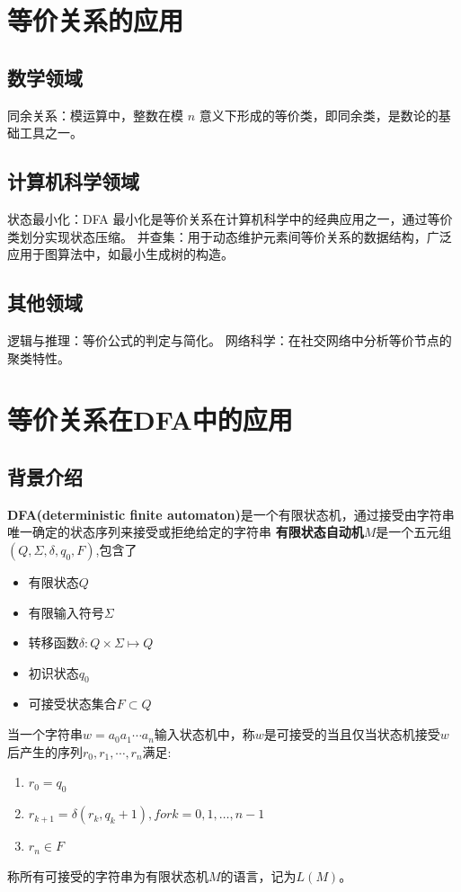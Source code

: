 \documentclass{article}
\begin{document}
\newpage
\section{等价关系的应用}
\subsection{数学领域}
同余关系：模运算中，整数在模 
$n$ 意义下形成的等价类，即同余类，是数论的基础工具之一。
\subsection{计算机科学领域}
状态最小化：DFA 最小化是等价关系在计算机科学中的经典应用之一，通过等价类划分实现状态压缩。
并查集：用于动态维护元素间等价关系的数据结构，广泛应用于图算法中，如最小生成树的构造。

\subsection{其他领域}
逻辑与推理：等价公式的判定与简化。
网络科学：在社交网络中分析等价节点的聚类特性。


\newpage
\section{等价关系在DFA中的应用}
\subsection{背景介绍}
    \textbf{DFA(deterministic finite automaton)}是一个有限状态机，通过接受由字符串唯一确定的状态序列来接受或拒绝给定的字符串
    \textbf{有限状态自动机}$M$是一个五元组$(Q, \Sigma, \delta, q_0, F)$,包含了
    \begin{itemize}
        \item 有限状态$Q$
        \item 有限输入符号$\Sigma$
        \item 转移函数$\delta: Q \times \Sigma \mapsto Q$
        \item 初识状态$q_0$
        \item 可接受状态集合$F \subset Q$
    \end{itemize}
    当一个字符串$w = a_0a_1\cdots a_n$输入状态机中，称$w$是可接受的当且仅当状态机接受$w$后产生的序列$r_0, r_1, \cdots, r_n$满足:
    \begin{enumerate}
        \item $r_0 = q_0$
        \item $r_{k+1} = \delta(r_k, q_k+1), for k = 0, 1, \ldots, n-1$
        \item $r_n \in F$
    \end{enumerate}
    称所有可接受的字符串为有限状态机$M$的语言，记为$L(M)$。
    
\end{document}
